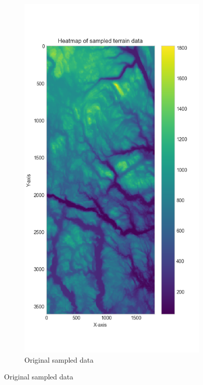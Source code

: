 \begin{figure}[H]
     \begin{subfigure}[h]{0.45\textwidth}
         \includegraphics[width=\textwidth]{Images/sampled_data_heatmap.png}
         \caption{Original sampled data}
         \label{terrain data heatmap comparison}

\end{subfigure}
\end{figure}
